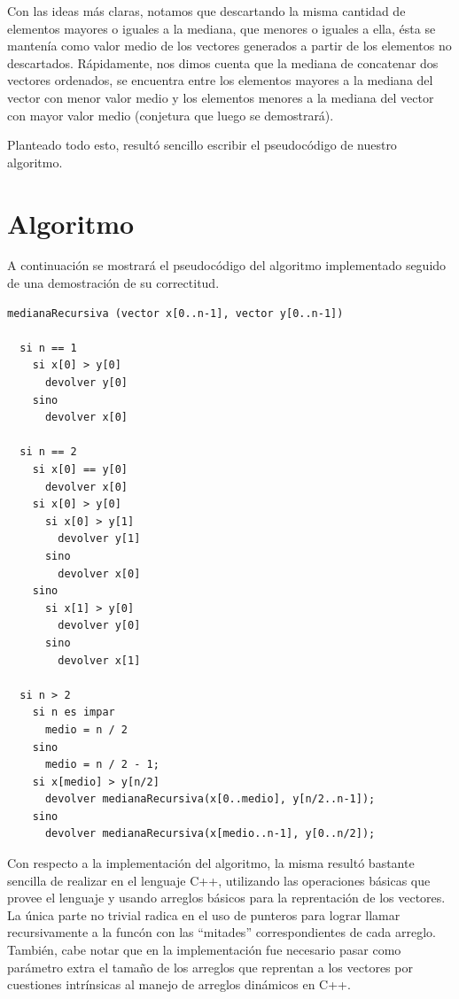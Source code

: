 \documentclass[a4paper,10pt] {article}
\begin{document}
Con las ideas m\'as claras, notamos que descartando la misma cantidad de elementos mayores o iguales a la mediana, que menores o iguales a ella, \'esta se manten\'ia como valor medio de los vectores generados a partir de los elementos no descartados. R\'apidamente, nos dimos cuenta que la mediana de concatenar dos vectores ordenados, se encuentra entre los elementos mayores a la mediana del vector con menor valor medio y los elementos menores a la mediana del vector con mayor valor medio (conjetura que luego se demostrar\'a).

Planteado todo esto, result\'o sencillo escribir el pseudoc\'odigo de nuestro algoritmo. 

\section*{Algoritmo}

A continuaci\'on se mostrar\'a el pseudoc\'odigo del algoritmo implementado seguido de una demostraci\'on de su correctitud.

\begin{verbatim}
medianaRecursiva (vector x[0..n-1], vector y[0..n-1])

  si n == 1
    si x[0] > y[0]
      devolver y[0]
    sino
      devolver x[0]

  si n == 2
    si x[0] == y[0]
      devolver x[0]
    si x[0] > y[0]
      si x[0] > y[1]
        devolver y[1]
      sino
        devolver x[0]
    sino
      si x[1] > y[0]
        devolver y[0]
      sino
        devolver x[1]

  si n > 2
    si n es impar
      medio = n / 2
    sino
      medio = n / 2 - 1;
    si x[medio] > y[n/2]
      devolver medianaRecursiva(x[0..medio], y[n/2..n-1]);
    sino
      devolver medianaRecursiva(x[medio..n-1], y[0..n/2]);
\end{verbatim}

Con respecto a la implementaci\'on del algoritmo, la misma result\'o bastante sencilla de realizar en el lenguaje C++, utilizando las operaciones b\'asicas que provee el lenguaje y usando arreglos b\'asicos para la reprentaci\'on de los vectores. La \'unica parte no trivial radica en el uso de punteros para lograr llamar recursivamente a la func\'on con las ``mitades'' correspondientes de cada arreglo. Tambi\'en, cabe notar que en la implementaci\'on fue necesario pasar como par\'ametro extra el tama\~{n}o de los arreglos que reprentan a los vectores por cuestiones intr\'insicas al manejo de arreglos din\'amicos en C++.
\end{document}

